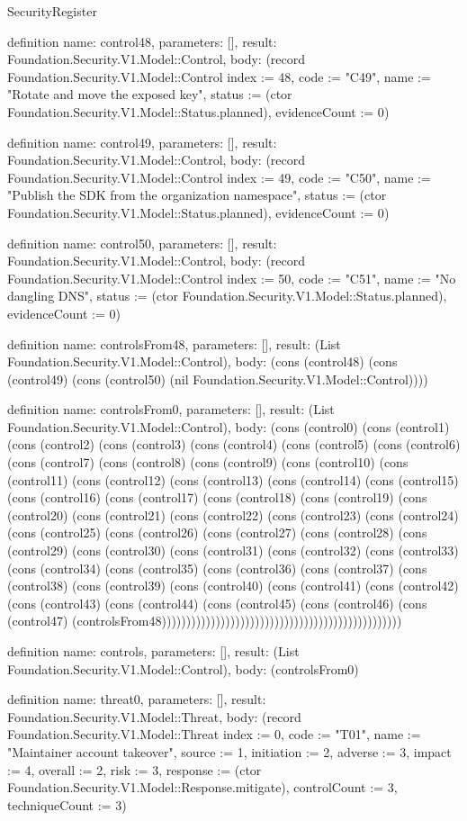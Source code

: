 \begin{lexlean}{SecurityRegister}
\begin{semanticmodule}
definition{
  name: control48,
  parameters: [],
  result: Foundation.Security.V1.Model::Control,
  body: (record Foundation.Security.V1.Model::Control {index := 48, code := "C49", name := "Rotate and move the exposed key", status := (ctor Foundation.Security.V1.Model::Status.planned), evidenceCount := 0})
}

definition{
  name: control49,
  parameters: [],
  result: Foundation.Security.V1.Model::Control,
  body: (record Foundation.Security.V1.Model::Control {index := 49, code := "C50", name := "Publish the SDK from the organization namespace", status := (ctor Foundation.Security.V1.Model::Status.planned), evidenceCount := 0})
}

definition{
  name: control50,
  parameters: [],
  result: Foundation.Security.V1.Model::Control,
  body: (record Foundation.Security.V1.Model::Control {index := 50, code := "C51", name := "No dangling DNS", status := (ctor Foundation.Security.V1.Model::Status.planned), evidenceCount := 0})
}

definition{
  name: controlsFrom48,
  parameters: [],
  result: (List Foundation.Security.V1.Model::Control),
  body: (cons (control48) (cons (control49) (cons (control50) (nil Foundation.Security.V1.Model::Control))))
}

definition{
  name: controlsFrom0,
  parameters: [],
  result: (List Foundation.Security.V1.Model::Control),
  body: (cons (control0) (cons (control1) (cons (control2) (cons (control3) (cons (control4) (cons (control5) (cons (control6) (cons (control7) (cons (control8) (cons (control9) (cons (control10) (cons (control11) (cons (control12) (cons (control13) (cons (control14) (cons (control15) (cons (control16) (cons (control17) (cons (control18) (cons (control19) (cons (control20) (cons (control21) (cons (control22) (cons (control23) (cons (control24) (cons (control25) (cons (control26) (cons (control27) (cons (control28) (cons (control29) (cons (control30) (cons (control31) (cons (control32) (cons (control33) (cons (control34) (cons (control35) (cons (control36) (cons (control37) (cons (control38) (cons (control39) (cons (control40) (cons (control41) (cons (control42) (cons (control43) (cons (control44) (cons (control45) (cons (control46) (cons (control47) (controlsFrom48)))))))))))))))))))))))))))))))))))))))))))))))))
}

definition{
  name: controls,
  parameters: [],
  result: (List Foundation.Security.V1.Model::Control),
  body: (controlsFrom0)
}

definition{
  name: threat0,
  parameters: [],
  result: Foundation.Security.V1.Model::Threat,
  body: (record Foundation.Security.V1.Model::Threat {index := 0, code := "T01", name := "Maintainer account takeover", source := 1, initiation := 2, adverse := 3, impact := 4, overall := 2, risk := 3, response := (ctor Foundation.Security.V1.Model::Response.mitigate), controlCount := 3, techniqueCount := 3})
}


\end{semanticmodule}
\end{lexlean}
